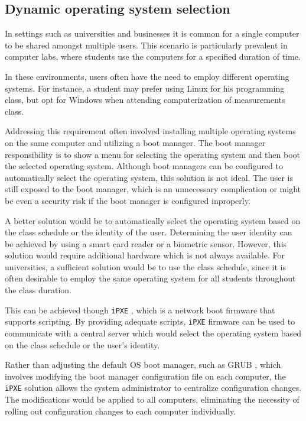 \documentclass[../main.tex]{subfiles}
\begin{document}
\subsection{Dynamic operating system selection}
In settings such as universities and businesses it is common for a single computer to be shared amongst multiple users.
This scenario is particularly prevalent in computer labs, where students use the computers for a specified duration of time.

In these environments, users often have the need to employ different operating systems.
For instance, a student may prefer using Linux for his programming class, but opt for Windows when attending computerization of measurements class.

Addressing this requirement often involved installing multiple operating systems on the same computer and utilizing a boot manager.
The boot manager responsibility is to show a menu for selecting the operating system and then boot the selected operating system.
Although boot managers can be configured to automatically select the operating system, this solution is not ideal.
The user is still exposed to the boot manager, which is an unnecessary complication or might be even a security risk if the boot manager is configured inproperly.

A better solution would be to automatically select the operating system based on the class schedule or the identity of the user.
Determining the user identity can be achieved by using a smart card reader or a biometric sensor. However, this solution would
require additional hardware which is not always available. For universities, a sufficient solution would be to use the class schedule,
since it is often desirable to employ the same operating system for all students throughout the class duration.

This can be achieved though \texttt{iPXE} \cite{ipxe}, which is a network boot firmware that supports scripting.
By providing adequate scripts, \texttt{iPXE} firmware can be used to communicate with a central server which would select the operating system based on the class schedule or the user's identity.

Rather than adjusting the default OS boot manager, such as GRUB \cite{grub}, which involves modifying the boot manager configuration file on each computer, the \texttt{iPXE} solution
allows the system administrator to centralize configuration changes. The modifications would be applied to all computers, eliminating the necessity of rolling out configuration changes to each computer individually.
\end{document}
